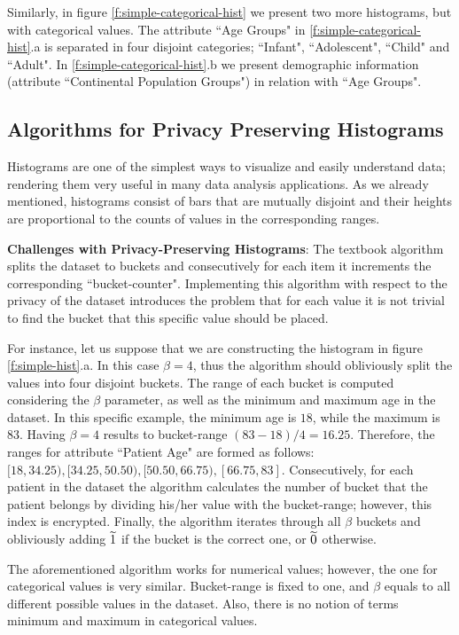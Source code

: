 Similarly, in figure \ref{f:simple-categorical-hist} we present two more histograms, but with categorical values.
The attribute ``Age Groups" in \ref{f:simple-categorical-hist}.a is separated in four disjoint categories; ``Infant", ``Adolescent", ``Child" and ``Adult".
In \ref{f:simple-categorical-hist}.b we present demographic information (attribute ``Continental Population Groups") in relation with ``Age Groups".





\subsection{Algorithms for Privacy Preserving Histograms}\label{ss:histogram-algos}
Histograms are one of the simplest ways to visualize and easily understand data; rendering them very useful in many data analysis applications.
As we already mentioned, histograms consist of bars that are mutually disjoint and their heights are proportional to the counts of values in the corresponding ranges.

\textbf{Challenges with Privacy-Preserving Histograms}: The textbook algorithm splits the dataset to buckets and consecutively for each item it increments the corresponding ``bucket-counter".
Implementing this algorithm with respect to the privacy of the dataset introduces the problem that for each value it is not trivial to find the bucket that this specific value should be placed.

For instance, let us suppose that we are constructing the histogram in figure \ref{f:simple-hist}.a.
In this case $\beta = 4$, thus the algorithm should obliviously split the values into four disjoint buckets.
The range of each bucket is computed considering the $\beta$ parameter, as well as the minimum and maximum age in the dataset.
In this specific example, the minimum age is $18$, while the maximum is $83$.
Having $\beta = 4$ results to bucket-range $(83 - 18) / 4 = 16.25$.
Therefore, the ranges for attribute ``Patient Age" are formed as follows: $[18, 34.25), [34.25, 50.50), [50.50, 66.75), [66.75, 83]$.
Consecutively, for each patient in the dataset the algorithm calculates the number of bucket that the patient belongs by dividing his/her value with the bucket-range; however, this index is encrypted.
Finally, the algorithm iterates through all $\beta$ buckets and obliviously adding $\widetilde{1}$ if the bucket is the correct one, or $\widetilde{0}$ otherwise.

The aforementioned algorithm works for numerical values; however, the one for categorical values is very similar.
Bucket-range is fixed to one, and $\beta$ equals to all different possible values in the dataset.
Also, there is no notion of terms minimum and maximum in categorical values.


